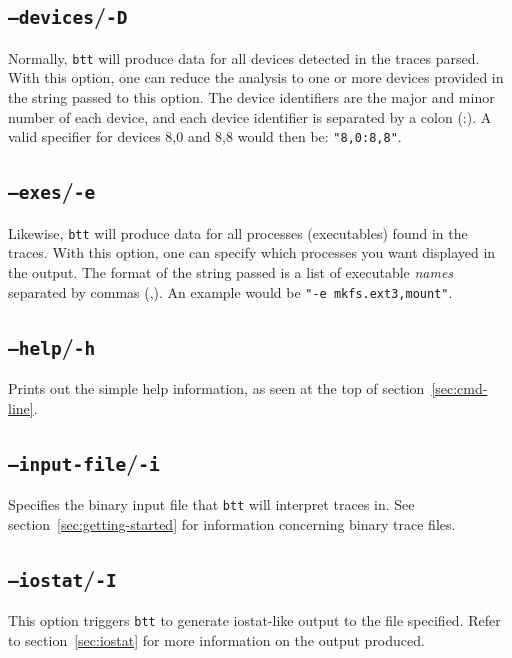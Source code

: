\documentclass{article}
\begin{document}
\subsection{\label{sec:o-D}\texttt{--devices}/\texttt{-D}}

  Normally, \texttt{btt} will produce data for all devices detected in
  the traces parsed. With this option, one can reduce the analysis to
  one or more devices provided in the string passed to this option. The
  device identifiers are the major and minor number of each device, and
  each device identifier is separated by a colon (:). A valid specifier
  for devices 8,0 and 8,8 would then be: \texttt{"8,0:8,8"}.

\subsection{\label{sec:o-e}\texttt{--exes}/\texttt{-e}}

  Likewise, \texttt{btt} will produce data for all processes (executables)
  found in the traces. With this option, one can specify which processes
  you want displayed in the output. The format of the string passed is
  a list of executable \emph{names} separated by commas (,). An example
  would be \texttt{"-e mkfs.ext3,mount"}.

\subsection{\label{sec:o-h}\texttt{--help}/\texttt{-h}}

  Prints out the simple help information, as seen at the top of
  section~\ref{sec:cmd-line}.

\subsection{\label{sec:o-i}\texttt{--input-file}/\texttt{-i}}

  Specifies the binary input file that \texttt{btt} will interpret traces
  in. See section~\ref{sec:getting-started} for information concerning
  binary trace files.

\subsection{\label{sec:o-I}\texttt{--iostat}/\texttt{-I}}

  This option triggers \texttt{btt} to generate iostat-like output to the
  file specified. Refer to section~\ref{sec:iostat} for more information
  on the output produced.
\end{document}
